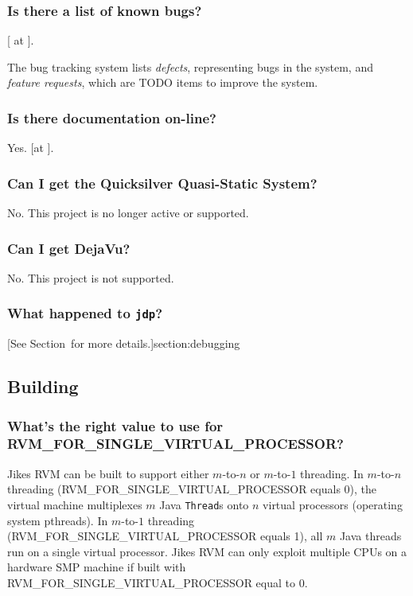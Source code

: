 \subsubsection{Is there a list of known bugs?}

[ at 
{\tt \RVMBugURL}]{\RVMBugURL}.

The bug tracking system lists {\em defects}, representing bugs in the system, and
{\em feature requests}, which are TODO items to improve the system.

\subsubsection{Is there documentation on-line?}

Yes.  [at
{\tt \RVMHomeURL}]{\RVMHomeURL}.

\subsubsection{Can I get the Quicksilver Quasi-Static System?}

No. This project is no longer active or supported.

\subsubsection{Can I get DejaVu?}

No. This project is not supported. 

\subsubsection{What happened to {\tt jdp}?}

[See
Section~\Ref for more details.]{section:debugging}

\subsection{Building \jrvm}


\subsubsection{What's the right value to use for
RVM\_FOR\_SINGLE\_VIRTUAL\_PROCESSOR?} 
\label{singleProcessorQuestion}

Jikes RVM can be built to support either $m$-to-$n$ or $m$-to-$1$
threading.  In $m$-to-$n$ threading
(RVM\_FOR\_SINGLE\_VIRTUAL\_PROCESSOR equals 0), the virtual machine
multiplexes $m$ Java {\tt Thread}s
onto $n$ virtual processors (operating system pthreads).
In $m$-to-$1$ threading (RVM\_FOR\_SINGLE\_VIRTUAL\_PROCESSOR equals 1),
all $m$ Java threads run on a single virtual processor.  Jikes RVM 
can only exploit multiple CPUs on a hardware SMP machine if 
built with RVM\_FOR\_SINGLE\_VIRTUAL\_PROCESSOR equal to 0.

